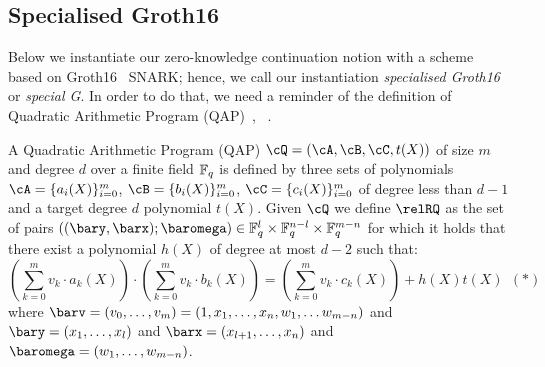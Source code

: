 \begin{definition}[ZK Continuations]
\end{definition} 


\subsection{Specialised Groth16}
\label{sec:rvrf_groth16}

Below we instantiate our zero-knowledge continuation notion with a scheme based on Groth16~\cite{Groth16} SNARK;
hence, we call our instantiation \emph{specialised Groth16} or \emph{special G}. In order to do that, we need a 
reminder of the definition of Quadratic Arithmetic Program (QAP)~\cite{legosnark}, ~\cite{BCTV14}.

\begin{definition}[QAP] 
\label{def:QAP}
A Quadratic Arithmetic Program (QAP) $\cQ = (\cA, \cB, \cC, t(X))$ of size $m$ 
and degree $d$ over a finite field $\mathbb{F}_q$ is defined by three sets of polynomials $\cA = \{a_i(X)\}_{i=0}^m$, 
$\cB = \{b_i(X)\}_{i=0}^m$, $\cC = \{c_i(X)\}_{i=0}^m$ of degree less than $d-1$ and a target degree $d$ polynomial $t(X)$. Given 
$\cQ$ we define $\relRQ$ as the set of pairs $((\bary, \barx); \baromega) \in \F_q^{l} \times \F_q^{n-l} \times \F_q^{m-n}$ for which it 
holds that there exist a polynomial $h(X)$ of degree at most $d-2$ such that:
$$(\sum_{k=0}^m v_k \cdot a_k(X)) \cdot (\sum_{k=0}^m v_k \cdot b_k(X)) = (\sum_{k=0}^m v_k \cdot c_k(X)) + h(X)t(X) \ \ (\ast)$$ 
where $\barv = (v_0, \ldots, v_m) = (1, x_1, \ldots, x_n, w_1, \ldots w_{m-n})$ and $\bary = (x_1, \ldots, x_l)$ and 
$\barx = (x_{l+1}, \ldots, x_n)$ and $\baromega = (w_1, \ldots, w_{m-n})$. 
\end{definition}



